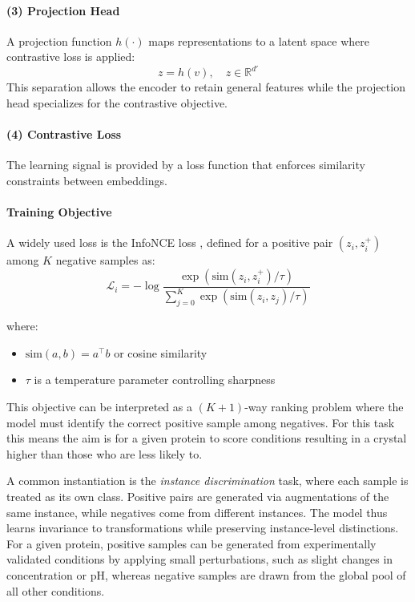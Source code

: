 \paragraph{(3) Projection Head}
A projection function $h(\cdot)$ maps representations to a latent space where contrastive loss is applied:
\begin{equation}
z = h(v), \quad z \in \mathbb{R}^{d'}
\end{equation}
This separation allows the encoder to retain general features while the projection head specializes for the contrastive objective.

\paragraph{(4) Contrastive Loss}
The learning signal is provided by a loss function that enforces similarity constraints between embeddings.

\paragraph{Training Objective}

A widely used loss is the InfoNCE loss \citep{LeKhac2020}, defined for a positive pair $(z_i, z_i^+)$ among $K$ negative samples as:
\begin{equation}
\mathcal{L}_i = - \log \frac{\exp(\text{sim}(z_i, z_i^+)/\tau)}
{\sum_{j=0}^{K} \exp(\text{sim}(z_i, z_j)/\tau)}
\end{equation}

where:
\begin{itemize}
    \item $\text{sim}(a,b) = a^\top b$ or cosine similarity
    \item $\tau$ is a temperature parameter controlling sharpness
\end{itemize}

This objective can be interpreted as a $(K+1)$-way ranking problem where the model must identify the correct positive sample among negatives. For this task this means the aim is for a given protein to score conditions resulting in a crystal higher than those who are less likely to. 

A common instantiation is the \textit{instance discrimination} task, where each sample is treated as its own class. Positive pairs are generated via augmentations of the same instance, while negatives come from different instances. The model thus learns invariance to transformations while preserving instance-level distinctions. For a given protein, positive samples can be generated from experimentally validated conditions by applying small perturbations, such as slight changes in concentration or pH, whereas negative samples are drawn from the global pool of all other conditions.

